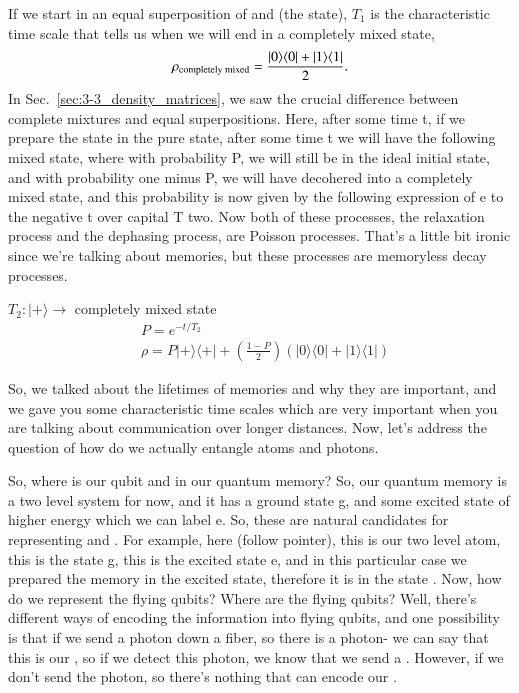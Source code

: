 If we start in an equal superposition of  and  (the \ket{+} state), $T_1$ is the characteristic time scale that tells us when we will end in a completely mixed state,
\begin{equation}
\begin{aligned}
\rho_{\textrm{completely mixed}} =\frac{|0 \rangle \langle 0|+|1 \rangle \langle 1|}{2}.
\end{aligned}
\end{equation}
In Sec.~\ref{sec:3-3_density_matrices}, we saw the crucial difference between complete mixtures and equal superpositions. Here, after some time t, if we prepare the state in the pure state, after some time t we will have the following mixed state, where with probability P, we will still be in the ideal initial state, and with probability one minus P, we will have decohered into a completely mixed state, and this probability is now given by the following expression of e to the negative t over capital T two. Now both of these processes, the relaxation process and the dephasing process, are Poisson processes. That's a little bit ironic since we're talking about memories, but these processes are memoryless decay processes.

$T_2:|+\rangle \rightarrow$ completely mixed state
$$
\begin{aligned}
&P=e^{-t / T_2} \\
&\rho=P|+\rangle\langle+|+\left(\frac{1-P}{2}\right)(|0\rangle\langle 0|+| 1\rangle\langle 1|)
\end{aligned}
$$

So, we talked about the lifetimes of memories and why they are important, and we gave you some characteristic time scales which are very important when you are talking about communication over longer distances. Now, let's address the question of how do we actually entangle atoms and photons.

So, where is our qubit  and  in our quantum memory? So, our quantum memory is a two level system for now, and it has a ground state g, and some excited state of higher energy which we can label e. So, these are natural candidates for representing  and . For example, here (follow pointer), this is our two level atom, this is the state g, this is the excited state e, and in this particular case we prepared the memory in the excited state, therefore it is in the state . Now, how do we represent the flying qubits? Where are the flying qubits? Well, there's different ways of encoding the information into flying qubits, and one possibility is that if we send a photon down a fiber, so there is a photon- we can say that this is our , so if we detect this photon, we know that we send a . However, if we don't send the photon, so there's nothing that can encode our .

